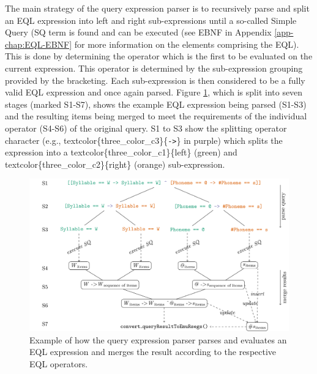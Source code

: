 \documentclass[]{book}
\theoremstyle{definition}
\theoremstyle{definition}
\theoremstyle{definition}
\theoremstyle{remark}
\begin{document}
The main strategy of the query expression parser is to recursively parse
and split an EQL expression into left and right sub-expressions until a
so-called Simple Query (SQ term is found and can be executed (see EBNF
in Appendix \ref{app-chap:EQL-EBNF} for more information on the elements
comprising the EQL). This is done by determining the operator which is
the first to be evaluated on the current expression. This operator is
determined by the sub-expression grouping provided by the bracketing.
Each sub-expression is then considered to be a fully valid EQL
expression and once again parsed. Figure
\ref{fig:query-queryParserExample1}, which is split into seven stages
(marked S1-S7), shows the example EQL expression being parsed (S1-S3)
and the resulting items being merged to meet the requirements of the
individual operator (S4-S6) of the original query. S1 to S3 show the
splitting operator character (e.g.,
textcolor\{three\_color\_c3\}\{\texttt{-\textgreater{}}\} in purple)
which splits the expression into a textcolor\{three\_color\_c1\}\{left\}
(green) and textcolor\{three\_color\_c2\}\{right\} (orange)
sub-expression.

\begin{figure}

{\centering \includegraphics[width=1\linewidth]{pics/queryParserExample1} 

}

\caption{Example of how the query expression parser parses and evaluates an EQL expression and merges the result according to the respective EQL operators.}\label{fig:query-queryParserExample1}
\end{figure}
\end{document}
